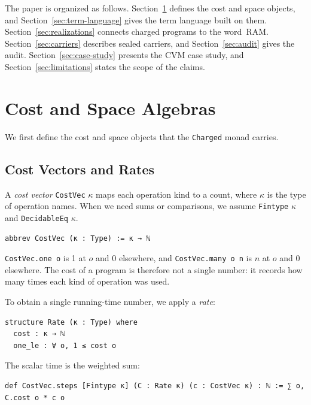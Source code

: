 \documentclass[acmsmall,nonacm]{acmart}
\begin{document}
The paper is organized as follows.
Section~\ref{sec:algebras} defines the cost and space objects, and Section~\ref{sec:term-language} gives the term language built on them.
Section~\ref{sec:realizations} connects charged programs to the word~RAM.
Section~\ref{sec:carriers} describes sealed carriers, and Section~\ref{sec:audit} gives the audit.
Section~\ref{sec:case-study} presents the CVM case study, and Section~\ref{sec:limitations} states the scope of the claims.


\section{Cost and Space Algebras}\label{sec:algebras}

We first define the cost and space objects that the \lstinline{Charged} monad carries.

\subsection{Cost Vectors and Rates}\label{sec:costvec}

A \emph{cost vector} \lstinline{CostVec} $\kappa$ maps each operation kind to a count, where $\kappa$ is the type of operation names.
When we need sums or comparisons, we assume \lstinline{Fintype} $\kappa$ and \lstinline{DecidableEq} $\kappa$.

\begin{lstlisting}
abbrev CostVec (κ : Type) := κ → ℕ
\end{lstlisting}

\lstinline{CostVec.one o} is 1 at $o$ and 0 elsewhere, and \lstinline{CostVec.many o n} is $n$ at $o$ and 0 elsewhere.
The cost of a program is therefore not a single number: it records how many times each kind of operation was used.

To obtain a single running-time number, we apply a \emph{rate}:

\begin{lstlisting}
structure Rate (κ : Type) where
  cost : κ → ℕ
  one_le : ∀ o, 1 ≤ cost o
\end{lstlisting}

The scalar time is the weighted sum:

\begin{lstlisting}
def CostVec.steps [Fintype κ] (C : Rate κ) (c : CostVec κ) : ℕ := ∑ o, C.cost o * c o
\end{lstlisting}
\end{document}
